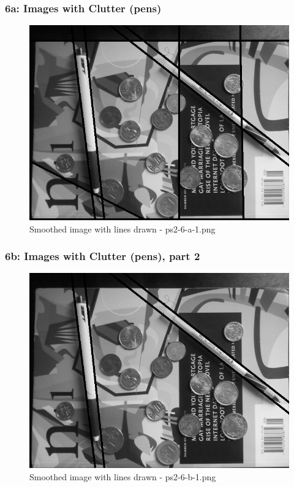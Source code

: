     \begin{frame}
		\frametitle{6a: Images with Clutter (pens)}
		
		\begin{figure}[!htb]
			\centering
			\includegraphics[height=0.65\textheight]{./output/ps2-6-a-1.png}
			\caption{Smoothed image with lines drawn - ps2-6-a-1.png} 
		\end{figure}	
		
	\end{frame}
    
    \begin{frame}
		\frametitle{6b: Images with Clutter (pens), part 2}
		
		\begin{figure}[!htb]
			\centering
			\includegraphics[height=0.65\textheight]{./output/ps2-6-b-1.png}
			\caption{Smoothed image with lines drawn - ps2-6-b-1.png} 
		\end{figure}	
		
	\end{frame}
    
